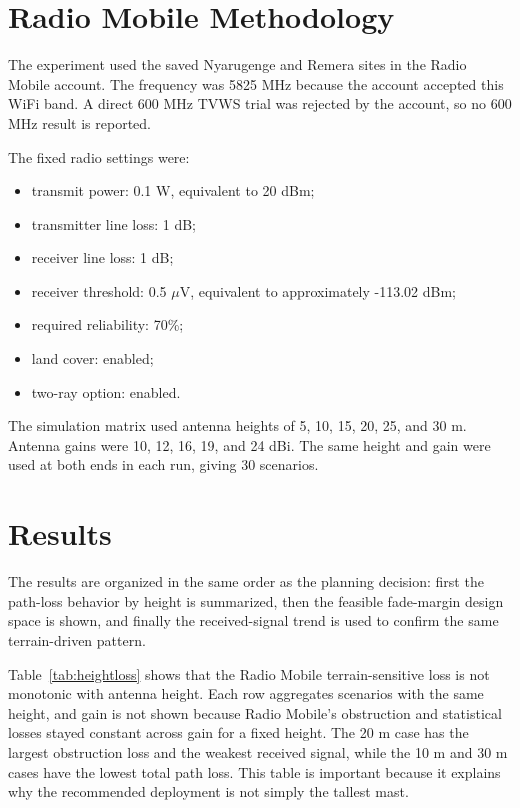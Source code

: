 \documentclass[journal]{IEEEtran}
\begin{document}
\section{Radio Mobile Methodology}

The experiment used the saved Nyarugenge and Remera sites in the Radio Mobile account. The frequency was 5825 MHz because the account accepted this WiFi band. A direct 600 MHz TVWS trial was rejected by the account, so no 600 MHz result is reported.

The fixed radio settings were:
\begin{itemize}
    \item transmit power: 0.1 W, equivalent to 20 dBm;
    \item transmitter line loss: 1 dB;
    \item receiver line loss: 1 dB;
    \item receiver threshold: 0.5 $\mu$V, equivalent to approximately -113.02 dBm;
    \item required reliability: 70\%;
    \item land cover: enabled;
    \item two-ray option: enabled.
\end{itemize}

The simulation matrix used antenna heights of 5, 10, 15, 20, 25, and 30 m. Antenna gains were 10, 12, 16, 19, and 24 dBi. The same height and gain were used at both ends in each run, giving 30 scenarios.

\section{Results}

The results are organized in the same order as the planning decision: first the path-loss behavior by height is summarized, then the feasible fade-margin design space is shown, and finally the received-signal trend is used to confirm the same terrain-driven pattern.

Table~\ref{tab:heightloss} shows that the Radio Mobile terrain-sensitive loss is not monotonic with antenna height. Each row aggregates scenarios with the same height, and gain is not shown because Radio Mobile's obstruction and statistical losses stayed constant across gain for a fixed height. The 20 m case has the largest obstruction loss and the weakest received signal, while the 10 m and 30 m cases have the lowest total path loss. This table is important because it explains why the recommended deployment is not simply the tallest mast.
\end{document}

